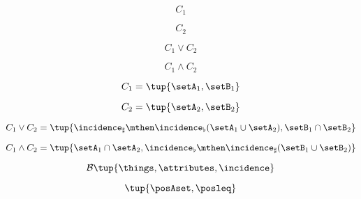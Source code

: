 {\begin{forslides}
        \begin{equation}
            \label{eq:slides_adjunctions_20}
            C_1
        \end{equation}

        \begin{equation}
            \label{eq:slides_adjunctions_21}
            C_2
        \end{equation}

        \begin{equation}
            \label{eq:slides_adjunctions_22}
            C_1 \vee C_2
        \end{equation}

        \begin{equation}
            \label{eq:slides_adjunctions_23}
            C_1 \wedge C_2
        \end{equation}

        \begin{equation}
            \label{eq:slides_adjunctions_24}
            C_1 = \tup{\setA_1, \setB_1}
        \end{equation}

        \begin{equation}
            \label{eq:slides_adjunctions_25}
            C_2 = \tup{\setA_2, \setB_2}
        \end{equation}

        \begin{equation}
            \label{eq:slides_adjunctions_26}
            C_1 \vee C_2 = \tup{ \incidence_\sharp \mthen \incidence_\flat(\setA_1 \cup \setA_2), \setB_1 \cap \setB_2}
        \end{equation}

        \begin{equation}
            \label{eq:slides_adjunctions_27}
            C_1 \wedge C_2 = \tup{ \setA_1 \cap \setA_2, \incidence_\flat \mthen \incidence_\sharp(\setB_1 \cup \setB_2)}
        \end{equation}

        \begin{equation}
            \label{eq:slides_adjunctions_28}
            \mathcal{B}\tup{\things, \attributes, \incidence}
        \end{equation}

        \begin{equation}
            \label{eq:slides_adjunctions_29}
            \tup{\posAset, \posleq}
        \end{equation}


\end{forslides}}
